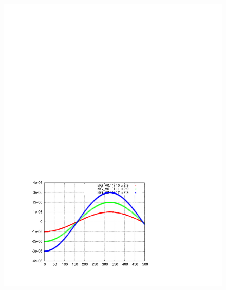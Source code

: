 \documentclass[]{article}
\begin{document}
\begin{figure}[h]
\begin{minipage}[b]{0.45\linewidth}
\includegraphics[scale=0.55]{pdf/delta_vs_turn_V0p1.pdf}
\end{minipage}
%
%
\begin{minipage}[b]{0.45\linewidth}
\centering

\end{minipage}
\end{figure}
\end{document}
